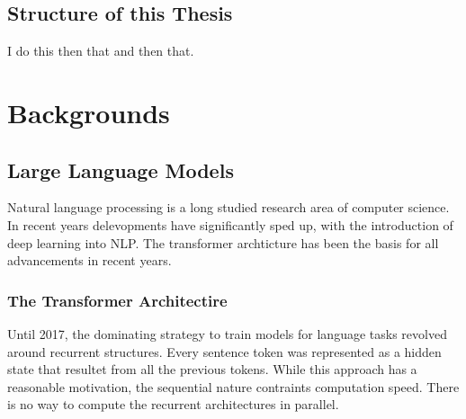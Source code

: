 \documentclass[english, version-2022-01]{uzl-thesis}
\begin{document}
\section{Structure of this Thesis}
I do this then that and then that.

\chapter{Backgrounds}






 \section{Large Language Models}

Natural language processing is a long studied research area of computer science.
In recent years delevopments have significantly sped up, with the introduction of deep learning into NLP.
The transformer archticture has been the basis for all advancements in recent years.

\subsection{The Transformer Architectire}
Until 2017, the dominating strategy to train models for language tasks revolved around recurrent structures.
Every sentence token was represented as a hidden state that resultet from all the previous tokens. 
While this approach has a reasonable motivation, the sequential nature contraints computation speed.
There is no way to compute the recurrent architectures in parallel.
\end{document}
